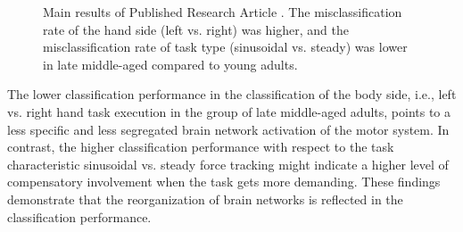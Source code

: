 \begin{figure}[h]

\caption[Main results of Published Research Article .]{Main results of Published Research Article . The misclassification rate of the hand side (left vs. right)  was higher, and the misclassification rate of task type (sinusoidal vs. steady) was lower in late middle-aged compared to young adults.}
\label{fig:results1}
\end{figure}

\noindent The lower classification performance in the classification of the body side, i.e., left vs. right hand task execution in the group of late middle-aged adults, points to a less specific and less segregated brain network activation of the motor system. In contrast, the higher classification performance with respect to the task characteristic sinusoidal vs. steady force tracking might indicate a higher level of compensatory involvement when the task gets more demanding. These findings demonstrate that the reorganization of brain networks is reflected in the classification performance.


